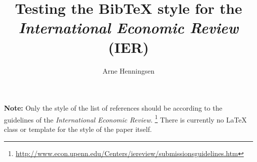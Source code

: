 \documentclass{article}
\title{Testing the Bib\TeX{} style for the
   \emph{International Economic Review} (IER)}
\author{Arne Henningsen}
\begin{document}
\maketitle

\textbf{Note:}
Only the style of the list of references should be according
to the guidelines of the \emph{International Economic Review}.%
\footnote{%
\url{http://www.econ.upenn.edu/Centers/iereview/submissionsguidelines.htm}
}
There is currently no \LaTeX{} class or template for the style
of the paper itself.


\nocite{*}


\end{document}
